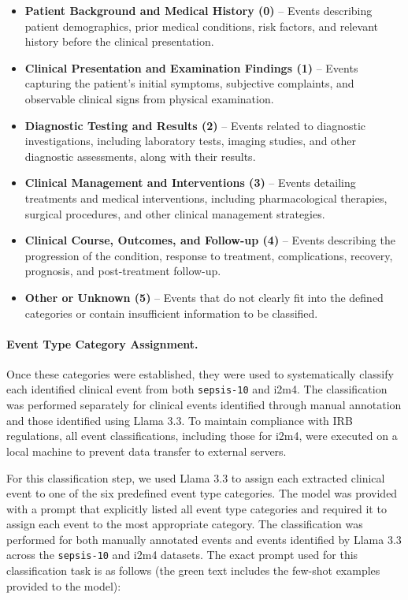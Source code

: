 \documentclass[pmlr,twocolumn,10pt]{jmlr} %
\begin{document}
\begin{itemize}
    \item \textbf{Patient Background and Medical History (0)} -- Events describing patient demographics, prior medical conditions, risk factors, and relevant history before the clinical presentation.
    \item \textbf{Clinical Presentation and Examination Findings (1)} -- Events capturing the patient's initial symptoms, subjective complaints, and observable clinical signs from physical examination.
    \item \textbf{Diagnostic Testing and Results (2)} -- Events related to diagnostic investigations, including laboratory tests, imaging studies, and other diagnostic assessments, along with their results.
    \item \textbf{Clinical Management and Interventions (3)} -- Events detailing treatments and medical interventions, including pharmacological therapies, surgical procedures, and other clinical management strategies.
    \item \textbf{Clinical Course, Outcomes, and Follow-up (4)} -- Events describing the progression of the condition, response to treatment, complications, recovery, prognosis, and post-treatment follow-up.
    \item \textbf{Other or Unknown (5)} -- Events that do not clearly fit into the defined categories or contain insufficient information to be classified.
\end{itemize}

\paragraph{Event Type Category Assignment.}
Once these categories were established, they were used to systematically classify each identified clinical event from both \texttt{sepsis-10} and i2m4. 
The classification was performed separately for clinical events identified through manual annotation and those identified using Llama 3.3. 
To maintain compliance with IRB regulations, all event classifications, including those for i2m4, were executed on a local machine to prevent data transfer to external servers.

For this classification step, we used Llama 3.3 to assign each extracted clinical event to one of the six predefined event type categories. 
The model was provided with a prompt that explicitly listed all event type categories and required it to assign each event to the most appropriate category. 
The classification was performed for both manually annotated events and events identified by Llama 3.3 across the \texttt{sepsis-10} and i2m4 datasets. 
The exact prompt used for this classification task is as follows (the green text includes the few-shot examples provided to the model):
\end{document}
